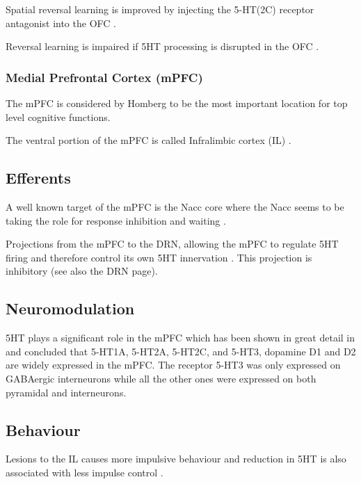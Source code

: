 \documentclass[12pt,a4paper]{article}
\begin{document}
Spatial reversal learning is improved by injecting the 5-HT(2C) receptor antagonist into the OFC \citep{Boulougouris2010}. 

Reversal learning is impaired if 5HT processing is disrupted in the OFC \citep{Bari2013}.

\subsubsection{Medial Prefrontal Cortex (mPFC)}

The mPFC is considered by Homberg to be the most important location for top level cognitive
functions. 

The ventral portion of the mPFC is called Infralimbic cortex (IL) \citep{Tsutsui-Kimura2016}.

\subsection{Efferents}

A well known target of the mPFC is the Nacc core where the Nacc seems to be taking the role for response inhibition and waiting \citep{Neufang2016} \citep{Feja2014}.

Projections from the mPFC to the DRN, allowing the mPFC to regulate 5HT firing and therefore control its own 5HT innervation  \citep{Homberg2012}\citep{Juckel1999}. This projection is inhibitory (see also the DRN page).

\subsection{Neuromodulation}

5HT plays a significant role in the mPFC which has been shown in great detail in \citep{Santana2017} and concluded that 5-HT1A, 5-HT2A, 5-HT2C, and 5-HT3, 
dopamine D1 and D2 are widely expressed in the mPFC. The receptor 5-HT3 was only expressed on GABAergic interneurons while all the other ones were expressed on both pyramidal and interneurons.


\subsection{Behaviour}
Lesions to the IL causes more impulsive behaviour \citep{Tsutsui-Kimura2016} and reduction in 5HT is also associated with less impulse control \citep{Neufang2016}.
\end{document}
